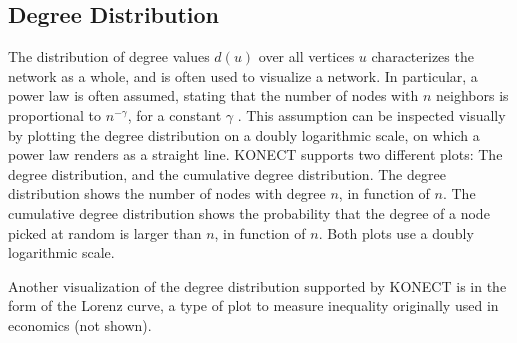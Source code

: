 \documentclass{article}
\begin{document}
\subsection{Degree Distribution} 
\label{sec:plot:degree}
The distribution of degree values $d(u)$ over all vertices $u$
characterizes the network as a whole, and is often used to visualize a
network. In particular, a power law is often assumed, stating that the
number of nodes with $n$ neighbors is proportional to $n^{-\gamma}$, for
a constant $\gamma$ \citep{b439}. This assumption can be inspected
visually by plotting the degree distribution on a doubly logarithmic
scale, on which a power law renders as a straight line.  KONECT supports
two different plots: The degree distribution, and the cumulative degree
distribution. The degree distribution shows the number of nodes with
degree $n$, in function of $n$.  The cumulative degree distribution
shows the probability that the degree of a node picked at random is
larger than $n$, in function of $n$. Both plots use a doubly logarithmic
scale.

Another visualization of the degree distribution supported by KONECT is
in the form of the Lorenz curve, a type of plot to measure inequality
originally used in economics (not shown).
\end{document}
